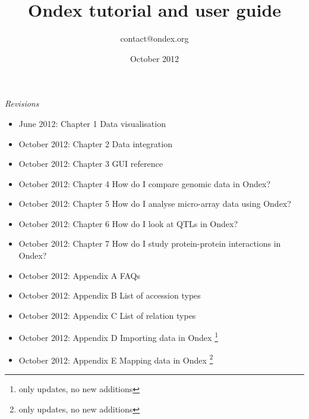 \documentclass[]{report}
\date{October 2012}
\title{Ondex tutorial and user guide}
\author{contact@ondex.org}
\begin{document}
\sloppy
\maketitle
\tableofcontents

\vspace{1cm}
\emph{Revisions}
\begin{itemize}
\item{June 2012:} Chapter 1 Data visualisation
\item{October 2012:} Chapter 2 Data integration
\item{October 2012:} Chapter 3 GUI reference
\item{October 2012:} Chapter 4 How do I compare genomic data in Ondex?
\item{October 2012:} Chapter 5 How do I analyse micro-array data using Ondex?
\item{October 2012:} Chapter 6 How do I look at QTLs in Ondex?
\item{October 2012:} Chapter 7 How do I study protein-protein interactions in Ondex?
\item{October 2012:} Appendix A FAQs
\item{October 2012:} Appendix B List of accession types
\item{October 2012:} Appendix C List of relation types
\item{October 2012:} Appendix D Importing data in Ondex \footnote{only updates, no new additions}
\item{October 2012:} Appendix E Mapping data in Ondex \footnote{only updates, no new additions}
\end{itemize}


\appendix

%

%
\end{document}
